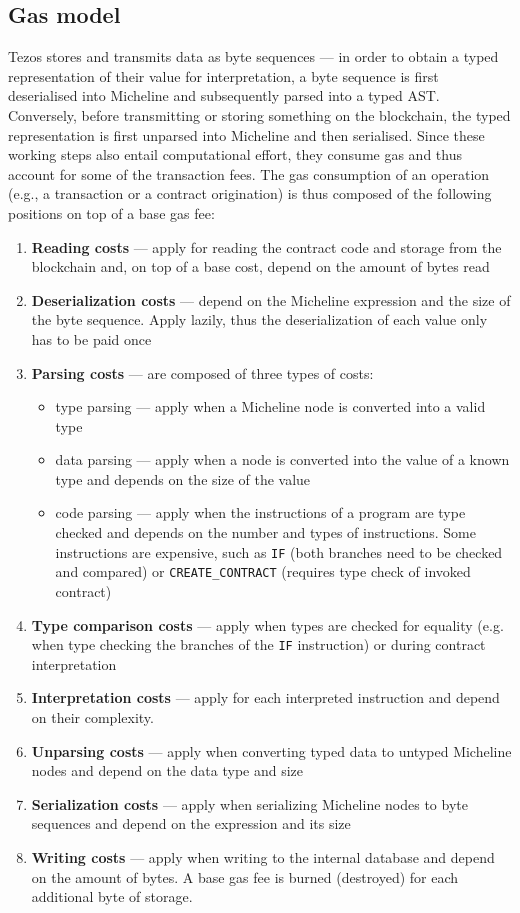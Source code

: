 \subsection{Gas model}
Tezos stores and transmits data as byte sequences --- in order to obtain a typed representation of their value for interpretation, a byte sequence is first deserialised into Micheline and subsequently parsed into a typed AST. Conversely, before transmitting or storing something on the blockchain, the typed representation is first unparsed into Micheline and then serialised. Since these working steps also entail computational effort, they consume gas and thus account for some of the transaction fees. The gas consumption of an operation (e.g., a transaction or a contract origination) is thus composed of the following positions \cite{morley_gasmodel}\cite{tezos_repo} on top of a base gas fee:
\begin{enumerate}
\item \textbf{Reading costs} --- apply for reading the contract code and storage from the blockchain and, on top of a base cost, depend on the amount of bytes read
\item \textbf{Deserialization costs} --- depend on the Micheline expression and the size of the byte sequence. Apply lazily, thus the deserialization of each value only has to be paid once
\item \textbf{Parsing costs} --- are composed of three types of costs:
	\begin{itemize}
	\item type parsing --- apply when a Micheline node is converted into a valid type
	\item data parsing --- apply when a node is converted into the value of a known type and depends on the size of the value
	\item code parsing --- apply when the instructions of a program are type checked and depends on the number and types of instructions. Some instructions are expensive, such as \texttt{IF} (both branches need to be checked and compared) or \texttt{CREATE\_CONTRACT} (requires type check of invoked contract)
	\end{itemize}
\item \textbf{Type comparison costs} --- apply when types are checked for equality (e.g. when type checking the branches of the \texttt{IF} instruction) or during contract interpretation
\item \textbf{Interpretation costs} --- apply for each interpreted instruction and depend on their complexity.
\item \textbf{Unparsing costs} --- apply when converting typed data to untyped Micheline nodes and depend on the data type and size
\item \textbf{Serialization costs} --- apply when serializing Micheline nodes to byte sequences and depend on the expression and its size
\item \textbf{Writing costs} --- apply when writing to the internal database and depend on the amount of bytes. A base gas fee is burned (destroyed) for each additional byte of storage.
\end{enumerate}
